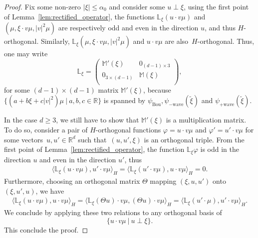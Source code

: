 \documentclass[AHL,Unicode,longabstracts,published]{cedram}
\newcommand{\Wave}{\mathrm{wave}}
\newcommand{\Bou}{\mathrm{Bou}}
\newcommand{\R}{\mathbb{R}}
\newcommand{\rectL}{\mathbb{L}}
\newcommand{\rectsL}{\mathbb{M}}
\newcommand{\Ss}{H}
\renewcommand*\le{\leqslant}
\renewcommand*\ge{\geqslant}
\begin{document}
\begin{proof}
Fix some non-zero $| \xi | \le \alpha_0$ and consider some $u \perp \xi$, using the first point of Lemma~\ref{lem:rectified_operator}, the functions $\rectL_{\xi} (u \cdot v \mu)$ and~$(\mu, \xi \cdot v \mu, |v|^2 \mu)$ are respectively odd and even in the direction $u$, and thus $\Ss$-orthogonal. Similarly, $\rectL_\xi (\mu, \xi \cdot v \mu, |v|^2 \mu)$ and $u \cdot v \mu$ are also~$\Ss$-orthogonal. Thus, one may write
\[
\rectL_{\xi} = \left(
\begin{matrix}
\rectsL'(\xi) & 0_{(d-1) \times 3} \\
0_{3 \times (d-1)} & \rectsL(\xi) \\
\end{matrix}
\right),
\]
for some $(d-1) \times (d-1)$ matrix $\rectsL'(\xi)$, because $\{(a + b \xi + c | v |^2)\mu~|~a, b, c \in \R \}$ is spanned by $\psi_{\Bou}, \psi_{- \Wave}(\widetilde{\xi} )$ and $\psi_{+\Wave}(\widetilde{\xi})$.


In the case $d \ge 3$, we still have to show that $\rectsL'(\xi)$ is a multiplication matrix. To do so, consider a pair of $\Ss$-orthogonal functions $\varphi = u \cdot v \mu$ and $\varphi' = u' \cdot v \mu$ for some vectors~$u, u' \in \R^d$ such that~$(u, u', \xi)$ is an orthogonal triple. From the first point of Lemma~\ref{lem:rectified_operator}, the function $\rectL_{\xi} \varphi$ is odd in the direction $u$ and even in the direction $u'$, thus
\begin{gather*}
\big\langle \rectL_\xi (u \cdot v \mu), u' \cdot v \mu \big\rangle_{\Ss} = \big\langle \rectL_\xi \left(u' \cdot v \mu\right), u \cdot v \mu \big\rangle_{\Ss} = 0.
\end{gather*}
Furthermore, choosing an orthogonal matrix $\Theta$ mapping $(\xi, u, u')$ onto $(\xi, u', u)$, we have
\begin{align*}
\big\langle \rectL_\xi (u \cdot v \mu), u \cdot v \mu \big\rangle_{\Ss} = \big\langle \rectL_\xi (\Theta u) \cdot v \mu, (\Theta u) \cdot v \mu \big\rangle_{\Ss} = \big\langle \rectL_\xi \left(u' \cdot \mu\right), u' \cdot v \mu \big\rangle_{\Ss}.
\end{align*}
We conclude by applying these two relations to any orthogonal basis of
\[
\Big\{ u \cdot v \mu~|~u \perp \xi \Big \}.
\]
This conclude the proof.
\end{proof}
\end{document}

